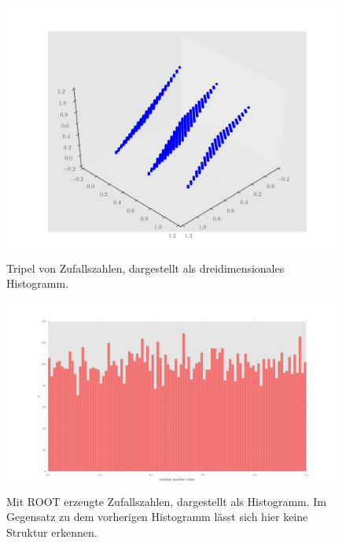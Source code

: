 \begin{itemize}
\begin{itemize}
\begin{figure}
\centering
\includegraphics[width=\textwidth]{3dscatter.png}
\caption{Tripel von Zufallszahlen, dargestellt als dreidimensionales Histogramm.}
\label{fig:2c2}
\end{figure}
 

\begin{figure}
\centering
\includegraphics[width=\textwidth]{1dhist_root.png}
\caption{Mit ROOT erzeugte Zufallszahlen, dargestellt als Histogramm. Im Gegensatz zu dem vorherigen Histogramm lässt sich hier keine Struktur erkennen.}
\label{fig:2e1}
\end{figure}


\end{itemize}
\end{itemize}
